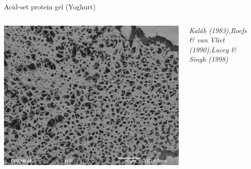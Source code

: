 \documentclass[xcolor=table]{beamer}
\begin{document}
\begin{frame}{Acid-set protein gel (Yoghurt)}
\begin{columns}
\includegraphics[width=\textwidth, clip=true, trim=0 0 0 10cm]{MEB_cas4_gdl1_22}

\begin{scriptsize}
\textit{Kaláb (1983),\linebreak Roefs \& van Vliet (1990),\linebreak Lucey \& Singh (1998)}
\end{scriptsize}
\end{columns}
\end{frame}
\end{document}
